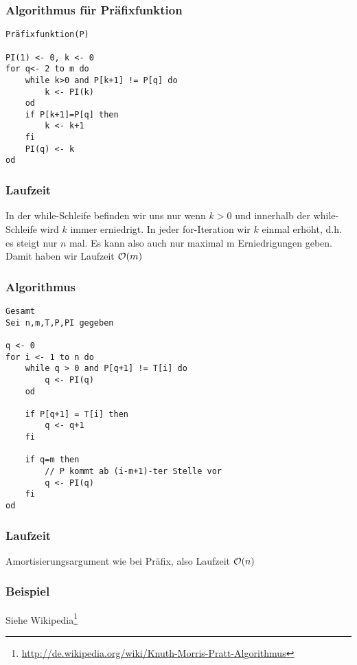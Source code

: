             \subsubsection{Algorithmus für Präfixfunktion}
\begin{verbatim}
Präfixfunktion(P)

PI(1) <- 0, k <- 0
for q<- 2 to m do
    while k>0 and P[k+1] != P[q] do
        k <- PI(k)
    od
    if P[k+1]=P[q] then 
        k <- k+1
    fi
    PI(q) <- k
od
\end{verbatim}

            \subsubsection{Laufzeit}
                In der while-Schleife befinden wir uns nur wenn $k>0$ und innerhalb der while-Schleife wird $k$ immer erniedrigt. In jeder for-Iteration wir $k$ einmal erhöht, d.h. es steigt nur $n$ mal. Es kann also auch nur maximal m Erniedrigungen geben. Damit haben wir Laufzeit $\mathcal{O}(m)$
                
            \subsubsection{Algorithmus}
\begin{verbatim}
Gesamt
Sei n,m,T,P,PI gegeben

q <- 0
for i <- 1 to n do
    while q > 0 and P[q+1] != T[i] do
        q <- PI(q)
    od
    
    if P[q+1] = T[i] then
        q <- q+1
    fi
    
    if q=m then
        // P kommt ab (i-m+1)-ter Stelle vor
        q <- PI(q)
    fi
od
\end{verbatim}
            \subsubsection{Laufzeit}
                Amortisierungsargument wie bei Präfix, also Laufzeit $\mathcal{O}(n)$
                
            \subsubsection{Beispiel}
                Siehe Wikipedia\footnote{\url{http://de.wikipedia.org/wiki/Knuth-Morris-Pratt-Algorithmus}}
                
